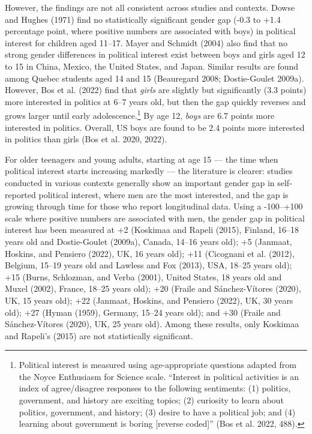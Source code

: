 \documentclass[
  letterpaper,
  DIV=11,
  numbers=noendperiod]{scrreprt}
\begin{document}
However, the findings are not all consistent across studies and
contexts. Dowse and Hughes (1971) find no statistically significant
gender gap (-0.3 to +1.4 percentage point, where positive numbers are
associated with boys) in political interest for children aged 11--17.
Mayer and Schmidt (2004) also find that no strong gender differences in
political interest exist between boys and girls aged 12 to 15 in China,
Mexico, the United States, and Japan. Similar results are found among
Quebec students aged 14 and 15 (Beauregard 2008; Dostie-Goulet 2009a).
However, Bos et al. (2022) find that \emph{girls} are slightly but
significantly (3.3 points) more interested in politics at 6--7 years
old, but then the gap quickly reverses and grows larger until early
adolescence.\footnote{Political interest is measured using
  age-appropriate questions adapted from the Noyce Enthusiasm for
  Science scale. ``Interest in political activities is an index of
  agree/disagree responses to the following sentiments: (1) politics,
  government, and history are exciting topics; (2) curiosity to learn
  about politics, government, and history; (3) desire to have a
  political job; and (4) learning about government is boring {[}reverse
  coded{]}'' (Bos et al. 2022, 488).} By age 12, \emph{boys} are 6.7
points more interested in politics. Overall, US boys are found to be 2.4
points more interested in politics than girls (Bos et al. 2020, 2022).

For older teenagers and young adults, starting at age 15 --- the time
when political interest starts increasing markedly --- the literature is
clearer: studies conducted in various contexts generally show an
important gender gap in self-reported political interest, where men are
the most interested, and the gap is growing through time for those who
report longitudinal data. Using a -100--+100 scale where positive
numbers are associated with men, the gender gap in political interest
has been measured at +2 (Koskimaa and Rapeli (2015), Finland, 16--18
years old and Dostie-Goulet (2009a), Canada, 14--16 years old); +5
(Janmaat, Hoskins, and Pensiero (2022), UK, 16 years old); +11
(Cicognani et al. (2012), Belgium, 15--19 years old and Lawless and Fox
(2013), USA, 18--25 years old); +15 (Burns, Schlozman, and Verba (2001),
United States, 18 years old and Muxel (2002), France, 18--25 years old);
+20 (Fraile and Sánchez-Vítores (2020), UK, 15 years old); +22 (Janmaat,
Hoskins, and Pensiero (2022), UK, 30 years old); +27 (Hyman (1959),
Germany, 15--24 years old); and +30 (Fraile and Sánchez-Vítores (2020),
UK, 25 years old). Among these results, only Koskimaa and Rapeli's
(2015) are not statistically significant.
\end{document}
